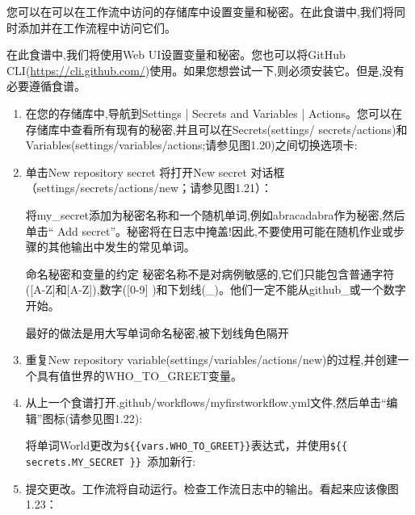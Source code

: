 
您可以在可以在工作流中访问的存储库中设置变量和秘密。在此食谱中,我们将同时添加并在工作流程中访问它们。


在此食谱中,我们将使用Web UI设置变量和秘密。您也可以将GitHub CLI(\url{https://cli.github.com/})使用。如果您想尝试一下,则必须安装它。但是,没有必要遵循食谱。


\begin{enumerate}
\item 
在您的存储库中,导航到Settings | Secrets and Variables | Actions。您可以在存储库中查看所有现有的秘密,并且可以在Secrets(settings/
secrets/actions)和Variables(settings/variables/actions;请参见图1.20)之间切换选项卡:


\item 
单击New repository secret 将打开New secret 对话框（settings/secrets/actions/new；请参见图1.21）：


将my\_secret添加为秘密名称和一个随机单词,例如abracadabra作为秘密,然后单击“ Add secret”。秘密将在日志中掩盖!因此,不要使用可能在随机作业或步骤的其他输出中发生的常见单词。

\begin{myTip}{命名秘密和变量的约定}
秘密名称不是对病例敏感的,它们只能包含普通字符([A-Z]和[A-Z]),数字([0-9] )和下划线(\_)。他们一定不能从github\_或一个数字开始。

最好的做法是用大写单词命名秘密,被下划线角色隔开
\end{myTip}

\item 
重复New repository variable(settings/variables/actions/new)的过程,并创建一个具有值世界的WHO\_TO\_GREET变量。

\item 
从上一个食谱打开.github/workflows/myfirstworkflow.yml文件,然后单击“编辑”图标(请参见图1.22):


将单词World更改为\verb|${{vars.WHO_TO_GREET}}|表达式，并使用\verb|${{ secrets.MY_SECRET }} |添加新行:


\item 
提交更改。工作流将自动运行。检查工作流日志中的输出。看起来应该像图1.23：


\end{enumerate}

